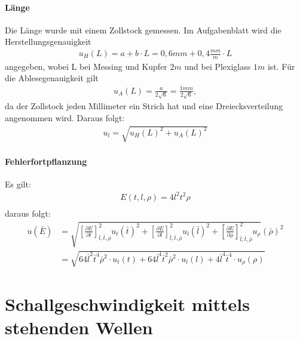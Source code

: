 \documentclass[11pt, a4paper]{article}
\begin{document}
    \paragraph{Länge}
    Die Länge wurde mit einem Zollstock gemessen. Im Aufgabenblatt wird die Herstellungsgenauigkeit
    \begin{align}
        u_H(L) = a+b \cdot L = 0,6mm + 0,4\frac{mm}{m} \cdot L
    \end{align}
    angegeben, wobei L bei Messing und Kupfer $2m$ und bei Plexiglass $1m$ ist.
    Für die Ablesegenauigkeit gilt
    \begin{align}
        u_A(L) = \frac{a}{2\sqrt{6}} = \frac{1mm}{2\sqrt{6}},
    \end{align}
    da der Zollstock jeden Millimeter ein Strich hat und eine Dreiecksverteilung angenommen wird.
    Daraus folgt:
    \begin{align}
        u_l = \sqrt{u_H(L)^2 + u_A(L)^2}
    \end{align}

    \paragraph{Fehlerfortpflanzung}
    Es gilt:
    \begin{align}
        E(t, l, \rho ) = 4l^2 t^2 \rho \\
    \end{align}
    daraus folgt:
    \begin{align}
        u(\bar{E}) &= \sqrt{\left[\frac{\partial E}{\partial t}\right]^2_{\bar{l}, \bar{t}, \bar{\rho}} u_{t}(\bar{t})^2 +
        \left[\frac{\partial E}{\partial l}\right]^2_{\bar{l}, \bar{t}, \bar{\rho}} u_{l}(\bar{l})^2 +
        \left[\frac{\partial E}{\partial \rho}\right]^2_{\bar{l}, \bar{t}, \bar{\rho}} u_{\rho}}(\bar{\rho})^2 \\ \nonumber
        &= \sqrt{64 \bar{l}^2\bar{t}^4 \bar{\rho}^2 \cdot u_t(t) +
        64 \bar{l}^4\bar{t}^2 \bar{\rho}^2 \cdot u_l(l) +
        4 \bar{l}^4\bar{t}^4 \cdot u_{\rho}(\rho)
        }
    \end{align}


    \section{Schallgeschwindigkeit mittels stehenden Wellen}
\end{document}
